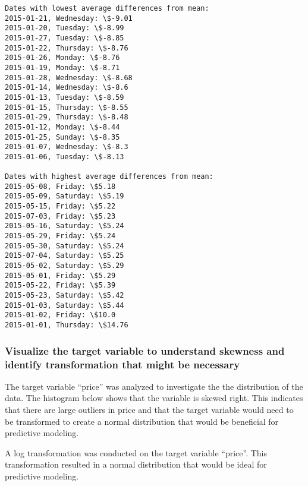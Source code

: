 \documentclass[11pt]{article}
\begin{document}
    \begin{Verbatim}[commandchars=\\\{\}]
Dates with lowest average differences from mean:
2015-01-21, Wednesday: \$-9.01
2015-01-20, Tuesday: \$-8.99
2015-01-27, Tuesday: \$-8.85
2015-01-22, Thursday: \$-8.76
2015-01-26, Monday: \$-8.76
2015-01-19, Monday: \$-8.71
2015-01-28, Wednesday: \$-8.68
2015-01-14, Wednesday: \$-8.6
2015-01-13, Tuesday: \$-8.59
2015-01-15, Thursday: \$-8.55
2015-01-29, Thursday: \$-8.48
2015-01-12, Monday: \$-8.44
2015-01-25, Sunday: \$-8.35
2015-01-07, Wednesday: \$-8.3
2015-01-06, Tuesday: \$-8.13

Dates with highest average differences from mean:
2015-05-08, Friday: \$5.18
2015-05-09, Saturday: \$5.19
2015-05-15, Friday: \$5.22
2015-07-03, Friday: \$5.23
2015-05-16, Saturday: \$5.24
2015-05-29, Friday: \$5.24
2015-05-30, Saturday: \$5.24
2015-07-04, Saturday: \$5.25
2015-05-02, Saturday: \$5.29
2015-05-01, Friday: \$5.29
2015-05-22, Friday: \$5.39
2015-05-23, Saturday: \$5.42
2015-01-03, Saturday: \$5.44
2015-01-02, Friday: \$10.0
2015-01-01, Thursday: \$14.76

    \end{Verbatim}

    \subsubsection{Visualize the target variable to understand skewness and
identify transformation that might be
necessary}\label{visualize-the-target-variable-to-understand-skewness-and-identify-transformation-that-might-be-necessary}

The target variable ``price'' was analyzed to investigate the the
distribution of the data. The histogram below shows that the variable is
skewed right. This indicates that there are large outliers in price and
that the target variable would need to be transformed to create a normal
distribution that would be beneficial for predictive modeling.

A log transformation was conducted on the target variable ``price''.
This transformation resulted in a normal distribution that would be
ideal for predictive modeling.
\end{document}
